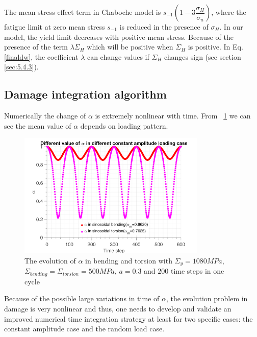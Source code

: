 \documentclass[3p,times,procedia,number]{elsarticle}
\newcommand{\figref}[1]{\figurename~\ref{#1}}
\begin{document}
The mean stress effect term in Chaboche model is $s_{-1}\left(1-3\dfrac{\sigma_H}{\sigma_u} \right)$, where the fatigue limit at zero mean stress $s_{-1}$ is reduced in the presence of $\sigma_H$. In our model, the yield limit decreases with positive mean stress. Because of the presence of the term $\lambda \Sigma_H$ which will be positive when $\Sigma_H$ is positive. In Eq.\ref{finaldw}, the coefficient $\lambda$ can change values if $\Sigma_H$ changes sign (see section \ref{sec:5.4.3}).


\subsection{Damage integration algorithm}

Numerically the  change of $\alpha$ is extremely nonlinear with time. From \figref{fig.alpmean} we can see the mean value of $\alpha$ depends on loading pattern. 

\begin{figure}[!h]
	\centering
	\includegraphics[width=0.8\textwidth]{figures//alp_mean_methods.png} 
	\caption{The evolution of $\alpha$ in bending and torsion with $\Sigma_y=1080 MPa$, $\Sigma_{bending}=\Sigma_{torsion}=500 MPa$, $a=0.3$ and $200$ time steps in one cycle}
	\label{fig.alpmean}
\end{figure}


Because of the possible large variations in time  of $\alpha$, the evolution problem in damage is very nonlinear and thus, one needs to develop and validate an improved numerical time integration strategy at least  for two specific cases: the constant amplitude case and the random load case.
\end{document}
